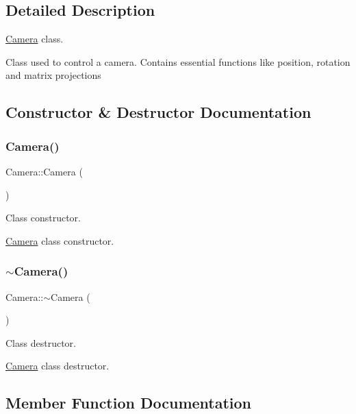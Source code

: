 \subsection{Detailed Description}
\hyperlink{class_camera}{Camera} class. 

Class used to control a camera. Contains essential functions like position, rotation and matrix projections 

\subsection{Constructor \& Destructor Documentation}
\mbox{\label{class_camera_a01f94c3543f56ede7af49dc778f19331}} 
\subsubsection{\texorpdfstring{Camera()}{Camera()}}
{\footnotesize\ttfamily Camera\+::\+Camera (\begin{DoxyParamCaption}{ }\end{DoxyParamCaption})}



Class constructor. 

\hyperlink{class_camera}{Camera} class constructor. \mbox{\label{class_camera_ad1897942d0ccf91052386388a497349f}} 
\subsubsection{\texorpdfstring{$\sim$\+Camera()}{~Camera()}}
{\footnotesize\ttfamily Camera\+::$\sim$\+Camera (\begin{DoxyParamCaption}{ }\end{DoxyParamCaption})}



Class destructor. 

\hyperlink{class_camera}{Camera} class destructor. 

\subsection{Member Function Documentation}
\mbox{\label{class_camera_a0a515e9b67a4f4f9d012209431e45448}} 
